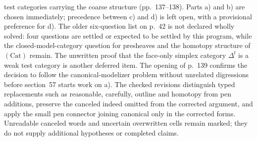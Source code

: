 test categories carrying the coarse structure (pp.~137--138). Parts a) and b) are chosen immediately; precedence between c) and d) is left open, with a provisional preference for d). The older six-question list on p.~42 is not declared wholly solved: four questions are settled or expected to be settled by this program, while the closed-model-category question for presheaves and the homotopy structure of $(\mathrm{Cat})$ remain. The unwritten proof that the face-only simplex category $\Delta^{\mathrm f}$ is a weak test category is another deferred item. The opening of p.~139 confirms the decision to follow the canonical-modelizer problem without unrelated digressions before section~57 starts work on a). The checked revisions distinguish typed replacements such as reasonable, carefully, outline and homotopy from pen additions, preserve the canceled indeed omitted from the corrected argument, and apply the small pen connector joining canonical only in the corrected forms. Unreadable canceled words and uncertain overwritten cells remain marked; they do not supply additional hypotheses or completed claims.

